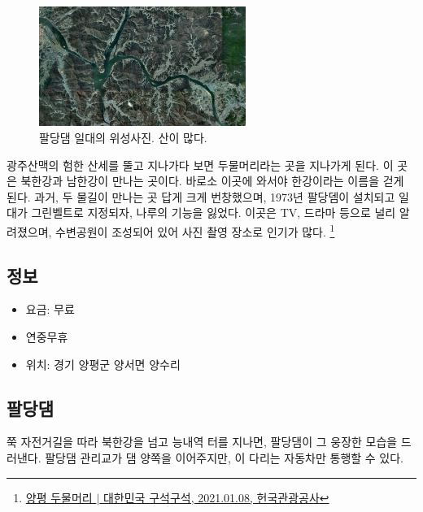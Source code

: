 \begin{figure}
    \centering
    \includegraphics[width=0.6\textwidth]{img/팔당호지도.png}
    \caption{팔당댐 일대의 위성사진. 산이 많다.\protect\footnotemark}
    \label{fig:my_label8}
\end{figure}


광주산맥의 험한 산세를 뚤고 지나가다 보면 두물머리라는 곳을 지나가게 된다. 이 곳은 북한강과 남한강이 만나는 곳이다.
바로소 이곳에 와서야 한강이라는 이름을 걷게 된다.
과거, 두 물길이 만나는 곳 답게 크게 번창했으며, 1973년 팔당뎀이 설치되고 일대가 그린벨트로 지정되자,
나루의 기능을 잃었다.
이곳은 TV, 드라마 등으로 널리 알려졌으며,
수변공원이 조성되어 있어 사진 촬영 장소로 인기가 많다.
\footnote{\href{https://terms.naver.com/entry.naver?docId=1997444&cid=42856&categoryId=42856}{양평 두물머리 $|$ 대한민국 구석구석, 2021.01.08, 헌국관광공사}}

\subsection{정보}
\begin{itemize}
    \item 요금: 무료
    \item 연중무휴
    \item 위치: 경기 양평군 양서면 양수리
\end{itemize}


\subsection{팔당댐}
쭉 자전거길을 따라 북한강을 넘고 능내역 터를 지나면, 팔당댐이 그 웅장한 모습을 드러낸다. 
팔당댐 관리교가 댐 양쪽을 이어주지만, 이 다리는 자동차만 통행할 수 있다.


